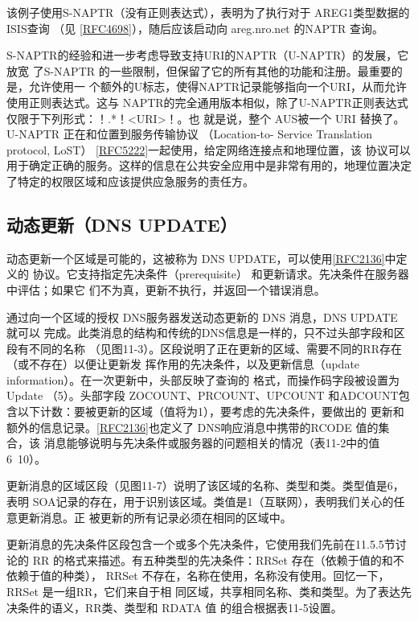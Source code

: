 该例子使用S-NAPTR（没有正则表达式），表明为了执行对于 AREG1类型数据的ISIS查询
（见 \href{https://www.rfc-editor.org/rfc/rfc4698}{[RFC4698]}），随后应该启动向 areg.nro.net 的NAPTR 查询。

S-NAPTR的经验和进一步考虑导致支持URI的NAPTR（U-NAPTR）的发展，它放宽
了S-NAPTR 的一些限制，但保留了它的所有其他的功能和注册。最重要的是，允许使用一
个额外的U标志，使得NAPTR记录能够指向一个URI，从而允许使用正则表达式。这与
NAPTR的完全通用版本相似，除了U-NAPTR正则表达式仅限于下列形式：！.*！<URI>！。也
就是说，整个 AUS被一个 URI 替换了。U-NAPTR 正在和位置到服务传输协议 （Location-to-
Service Translation protocol, LoST） \href{https://www.rfc-editor.org/rfc/rfc5222}{[RFC5222]}一起使用，给定网络连接点和地理位置，该
协议可以用于确定正确的服务。这样的信息在公共安全应用中是非常有用的，地理位置决定
了特定的权限区域和应该提供应急服务的责任方。

\subsection{动态更新（DNS UPDATE）}

动态更新一个区域是可能的，这被称为 DNS UPDATE，可以使用\href{https://www.rfc-editor.org/rfc/rfc2136}{[RFC2136]}中定义的
协议。它支持指定先决条件（prerequisite） 和更新请求。先决条件在服务器中评估；如果它
们不为真，更新不执行，并返回一个错误消息。

通过向一个区域的授权 DNS服务器发送动态更新的 DNS 消息，DNS UPDATE 就可以
完成。此类消息的结构和传统的DNS信息是一样的，只不过头部字段和区段有不同的名称
（见图11-3）。区段说明了正在更新的区域、需要不同的RR存在（或不存在）以便让更新发
挥作用的先决条件，以及更新信息（update information）。在一次更新中，头部反映了查询的
格式，而操作码字段被设置为Update （5）。头部字段 ZOCOUNT、PRCOUNT、UPCOUNT
和ADCOUNT包含以下计数：要被更新的区域（值将为1），要考虑的先决条件，要做出的
更新和额外的信息记录。\href{https://www.rfc-editor.org/rfc/rfc2136}{[RFC2136]}也定义了 DNS响应消息中携带的RCODE 值的集合，该
消息能够说明与先决条件或服务器的问题相关的情况（表11-2中的值6~10）。

更新消息的区域区段（见图11-7）说明了该区域的名称、类型和类。类型值是6，表明
SOA记录的存在，用于识别该区域。类值是1（互联网），表明我们关心的任意更新消息。正
被更新的所有记录必须在相同的区域中。

更新消息的先决条件区段包含一个或多个先决条件，它使用我们先前在11.5.5节讨论的
RR 的格式来描述。有五种类型的先决条件：RRSet 存在（依赖于值的和不依赖于值的种类），
RRSet 不存在，名称在使用，名称没有使用。回忆一下，RRSet 是一组RR，它们来自于相
同区域，共享相同名称、类和类型。为了表达先决条件的语义，RR类、类型和 RDATA 值
的组合根据表11-5设置。

